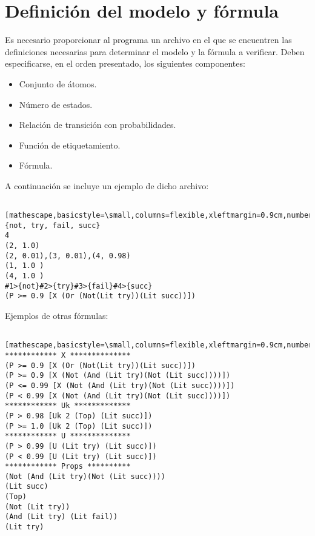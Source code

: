 \documentclass[12pt,letterpaper,spanish]{article}
\begin{document}
\section{Definición del modelo y fórmula}
Es necesario proporcionar al programa un archivo en el que se encuentren las definiciones necesarias
para determinar el modelo y la fórmula a verificar.
Deben especificarse, en el orden presentado, los siguientes componentes:
\begin{itemize}
 \item Conjunto de átomos.
 \item Número de estados.
 \item Relación de transición con probabilidades.
 \item Función de etiquetamiento.
 \item Fórmula.
\end{itemize}
A continuación se incluye un ejemplo de dicho archivo:
\begin{lstlisting} [mathescape,basicstyle=\small,columns=flexible,xleftmargin=0.9cm,numbers=left,label=ejemplo,language=C++,extendedchars=true]
{not, try, fail, succ}
4
(2, 1.0)
(2, 0.01),(3, 0.01),(4, 0.98)
(1, 1.0 )
(4, 1.0 )
#1>{not}#2>{try}#3>{fail}#4>{succ}
(P >= 0.9 [X (Or (Not(Lit try))(Lit succ))])
\end{lstlisting}
Ejemplos de otras fórmulas:
\begin{lstlisting} [mathescape,basicstyle=\small,columns=flexible,xleftmargin=0.9cm,numbers=left,label=ejemploF,language=C++,extendedchars=true]
************ X **************
(P >= 0.9 [X (Or (Not(Lit try))(Lit succ))])
(P >= 0.9 [X (Not (And (Lit try)(Not (Lit succ))))])
(P <= 0.99 [X (Not (And (Lit try)(Not (Lit succ))))])
(P < 0.99 [X (Not (And (Lit try)(Not (Lit succ))))])
************ Uk *************
(P > 0.98 [Uk 2 (Top) (Lit succ)])
(P >= 1.0 [Uk 2 (Top) (Lit succ)])
************ U **************
(P > 0.99 [U (Lit try) (Lit succ)])
(P < 0.99 [U (Lit try) (Lit succ)])
************ Props **********
(Not (And (Lit try)(Not (Lit succ))))
(Lit succ)
(Top)
(Not (Lit try))
(And (Lit try) (Lit fail))
(Lit try)
\end{lstlisting}
\end{document}
